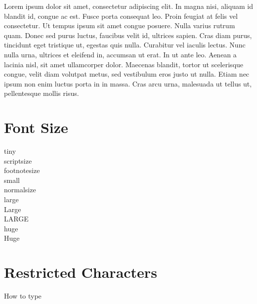 \documentclass[10pt]{article}
\begin{document}
 

\flushleft
Lorem ipsum dolor sit amet, consectetur adipiscing elit. In magna nisi, aliquam id blandit id, congue ac est. Fusce porta consequat leo. Proin feugiat at felis vel consectetur. Ut tempus ipsum sit amet congue posuere. Nulla varius rutrum quam. Donec sed purus luctus, faucibus velit id, ultrices sapien. Cras diam purus, tincidunt eget tristique ut, egestas quis nulla. Curabitur vel iaculis lectus. Nunc nulla urna, ultrices et eleifend in, accumsan ut erat. In ut ante leo. Aenean a lacinia nisl, sit amet ullamcorper dolor. Maecenas blandit, tortor ut scelerisque congue, velit diam volutpat metus, sed vestibulum eros justo ut nulla. Etiam nec ipsum non enim luctus porta in in massa. Cras arcu urna, malesuada ut tellus ut, pellentesque mollis risus.

\section{Font Size}

\flushleft
\tiny
tiny \\
\scriptsize
scriptsize \\
\footnotesize
footnotesize \\
\small
small\\
\normalsize
normalsize \\
\large
large \\
\Large
Large \\
\LARGE
LARGE \\
\huge
huge \\
\Huge
Huge \\


\normalsize

\section{Restricted Characters}

How to type %

\end{document}
